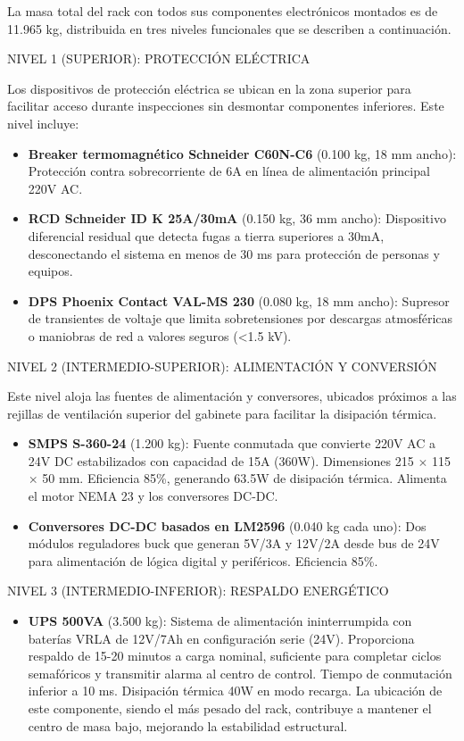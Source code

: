 \documentclass[12pt,a4paper,oneside]{report}
\begin{document}
La masa total del rack con todos sus componentes electrónicos montados es de 11.965 kg, distribuida en tres niveles funcionales que se describen a continuación.

NIVEL 1 (SUPERIOR): PROTECCIÓN ELÉCTRICA

Los dispositivos de protección eléctrica se ubican en la zona superior para facilitar acceso durante inspecciones sin desmontar componentes inferiores. Este nivel incluye:

\begin{itemize}
\item
  \textbf{Breaker termomagnético Schneider C60N-C6} (0.100 kg, 18 mm ancho): Protección contra sobrecorriente de 6A en línea de alimentación principal 220V AC.
\item
  \textbf{RCD Schneider ID K 25A/30mA} (0.150 kg, 36 mm ancho): Dispositivo diferencial residual que detecta fugas a tierra superiores a 30mA, desconectando el sistema en menos de 30 ms para protección de personas y equipos.
\item
  \textbf{DPS Phoenix Contact VAL-MS 230} (0.080 kg, 18 mm ancho): Supresor de transientes de voltaje que limita sobretensiones por descargas atmosféricas o maniobras de red a valores seguros (\textless1.5 kV).
\end{itemize}

NIVEL 2 (INTERMEDIO-SUPERIOR): ALIMENTACIÓN Y CONVERSIÓN

Este nivel aloja las fuentes de alimentación y conversores, ubicados próximos a las rejillas de ventilación superior del gabinete para facilitar la disipación térmica.

\begin{itemize}
\item
  \textbf{SMPS S-360-24} (1.200 kg): Fuente conmutada que convierte 220V AC a 24V DC estabilizados con capacidad de 15A (360W). Dimensiones 215 \ensuremath{\times} 115 \ensuremath{\times} 50 mm. Eficiencia 85\%, generando 63.5W de disipación térmica. Alimenta el motor NEMA 23 y los conversores DC-DC.
\item
  \textbf{Conversores DC-DC basados en LM2596} (0.040 kg cada uno): Dos módulos reguladores buck que generan 5V/3A y 12V/2A desde bus de 24V para alimentación de lógica digital y periféricos. Eficiencia 85\%.
\end{itemize}

NIVEL 3 (INTERMEDIO-INFERIOR): RESPALDO ENERGÉTICO

\begin{itemize}
\item
  \textbf{UPS 500VA} (3.500 kg): Sistema de alimentación ininterrumpida con baterías VRLA de 12V/7Ah en configuración serie (24V). Proporciona respaldo de 15-20 minutos a carga nominal, suficiente para completar ciclos semafóricos y transmitir alarma al centro de control. Tiempo de conmutación inferior a 10 ms. Disipación térmica 40W en modo recarga. La ubicación de este componente, siendo el más pesado del rack, contribuye a mantener el centro de masa bajo, mejorando la estabilidad estructural.
\end{itemize}
\end{document}
